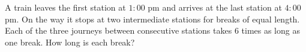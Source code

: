 A train leaves the first station at $1{:}00$ pm and arrives at the last station at $4{:}00$ pm. On the way it stops at two intermediate stations for breaks of equal length. Each of the three journeys between consecutive stations takes $6$ times as long as one break. How long is each break?
